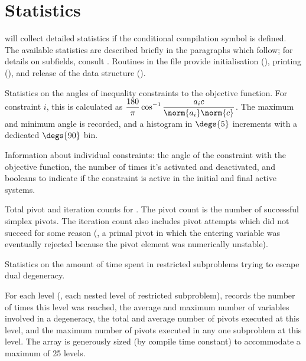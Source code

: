
\section{\dylp Statistics}
\label{sec:DylpStatistics}

\dylp will collect detailed statistics if the conditional compilation
symbol  is defined.
The available statistics are described briefly in the paragraphs which
follow; for details on subfields, consult .
Routines in the file  provide initialisation
(), printing (), and release of the
data structure ().

\begin{codedoc}
  \item
  Statistics on the angles of inequality constraints to the objective function.
  For constraint $i$, this is calculated as
  $\displaystyle \frac{180}{\pi} \cos^{-1} \frac{a_i c}{\norm{a_i}\norm{c}}$.
  The maximum and minimum angle is recorded, and a histogram in
  $\degs{5}$ increments with a dedicated $\degs{90}$ bin.

  \item
  Information about individual constraints: the angle of the constraint with
  the objective function, the number of times it's activated and deactivated,
  and booleans to indicate if the constraint is active in the initial and final
  active systems.

  \item{}
  Total pivot and iteration counts for \dylp.
  The pivot count is the number of successful simplex pivots.
  The iteration count also includes pivot attempts which did not succeed
  for some reason
  (\eg, a primal pivot in which the entering variable was eventually rejected
  because the pivot element was numerically unstable).

  \item{}
  Statistics on the amount of time spent in restricted subproblems trying to
  escape dual degeneracy.

  For each level (\ie, each nested level of restricted subproblem), \dylp
  records the number of times this level was reached, the average and maximum
  number of variables involved in a degeneracy, the total and average
  number of pivots executed at this level, and the maximum number of pivots
  executed in any one subproblem at this level.
  The array is generously sized (by compile time constant) to accommodate
  a maximum of 25 levels.


\end{codedoc}
